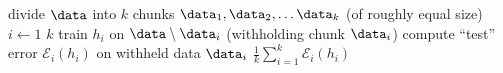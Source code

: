 \documentclass[10pt,oneside]{book}
\begin{document}
\pagestyle{empty}
\thispagestyle{empty}

\begin{codebox}
  \li divide $\data$ into $k$ chunks $\data_1, \data_2, \ldots \data_k$ (of roughly equal size)
  \li \For $i \gets 1$ \To $k$
  \li   \Do
          train $h_i$ on $\data \setminus \data_i$ (withholding chunk $\data_i$)
  \li     compute ``test'' error $\mathcal{E}_i (h_i)$ on withheld data $\data_i$
        \End
  \li \Return $\frac{1}{k} \sum_{i=1}^k \mathcal{E}_i (h_i)$
\end{codebox}
\end{document}
